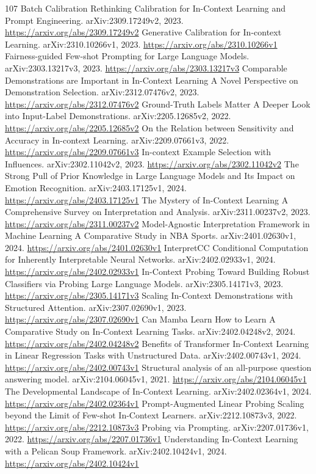 \documentclass[11pt]{article}
\begin{document}
\begin{thebibliography}{107}
 Batch Calibration Rethinking Calibration for In-Context Learning and Prompt Engineering. arXiv:2309.17249v2, 2023. \url{https://arxiv.org/abs/2309.17249v2}
 Generative Calibration for In-context Learning. arXiv:2310.10266v1, 2023. \url{https://arxiv.org/abs/2310.10266v1}
 Fairness-guided Few-shot Prompting for Large Language Models. arXiv:2303.13217v3, 2023. \url{https://arxiv.org/abs/2303.13217v3}
 Comparable Demonstrations are Important in In-Context Learning A Novel Perspective on Demonstration Selection. arXiv:2312.07476v2, 2023. \url{https://arxiv.org/abs/2312.07476v2}
 Ground-Truth Labels Matter A Deeper Look into Input-Label Demonstrations. arXiv:2205.12685v2, 2022. \url{https://arxiv.org/abs/2205.12685v2}
 On the Relation between Sensitivity and Accuracy in In-context Learning. arXiv:2209.07661v3, 2022. \url{https://arxiv.org/abs/2209.07661v3}
 In-context Example Selection with Influences. arXiv:2302.11042v2, 2023. \url{https://arxiv.org/abs/2302.11042v2}
 The Strong Pull of Prior Knowledge in Large Language Models and Its Impact on Emotion Recognition. arXiv:2403.17125v1, 2024. \url{https://arxiv.org/abs/2403.17125v1}
 The Mystery of In-Context Learning A Comprehensive Survey on Interpretation and Analysis. arXiv:2311.00237v2, 2023. \url{https://arxiv.org/abs/2311.00237v2}
 Model-Agnostic Interpretation Framework in Machine Learning A Comparative Study in NBA Sports. arXiv:2401.02630v1, 2024. \url{https://arxiv.org/abs/2401.02630v1}
 InterpretCC Conditional Computation for Inherently Interpretable Neural Networks. arXiv:2402.02933v1, 2024. \url{https://arxiv.org/abs/2402.02933v1}
 In-Context Probing Toward Building Robust Classifiers via Probing Large Language Models. arXiv:2305.14171v3, 2023. \url{https://arxiv.org/abs/2305.14171v3}
 Scaling In-Context Demonstrations with Structured Attention. arXiv:2307.02690v1, 2023. \url{https://arxiv.org/abs/2307.02690v1}
 Can Mamba Learn How to Learn A Comparative Study on In-Context Learning Tasks. arXiv:2402.04248v2, 2024. \url{https://arxiv.org/abs/2402.04248v2}
 Benefits of Transformer In-Context Learning in Linear Regression Tasks with Unstructured Data. arXiv:2402.00743v1, 2024. \url{https://arxiv.org/abs/2402.00743v1}
 Structural analysis of an all-purpose question answering model. arXiv:2104.06045v1, 2021. \url{https://arxiv.org/abs/2104.06045v1}
 The Developmental Landscape of In-Context Learning. arXiv:2402.02364v1, 2024. \url{https://arxiv.org/abs/2402.02364v1}
 Prompt-Augmented Linear Probing Scaling beyond the Limit of Few-shot In-Context Learners. arXiv:2212.10873v3, 2022. \url{https://arxiv.org/abs/2212.10873v3}
 Probing via Prompting. arXiv:2207.01736v1, 2022. \url{https://arxiv.org/abs/2207.01736v1}
 Understanding In-Context Learning with a Pelican Soup Framework. arXiv:2402.10424v1, 2024. \url{https://arxiv.org/abs/2402.10424v1}
\end{thebibliography}
\end{document}
